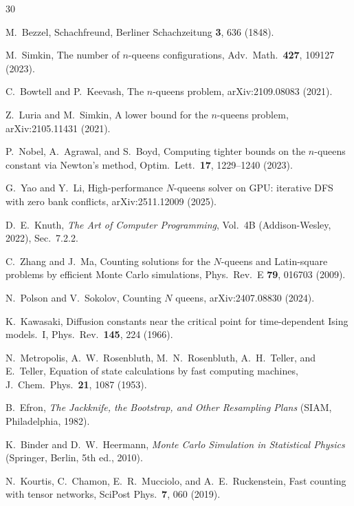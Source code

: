 \documentclass[aps, pre, reprint, amsmath, amssymb, superscriptaddress, floatfix]{revtex4-2}
\begin{document}
\begin{thebibliography}{30}

M.~Bezzel,
Schachfreund, Berliner Schachzeitung \textbf{3}, 636 (1848).

M.~Simkin,
The number of $n$-queens configurations,
Adv.\ Math.\ \textbf{427}, 109127 (2023).

C.~Bowtell and P.~Keevash,
The $n$-queens problem,
arXiv:2109.08083 (2021).

Z.~Luria and M.~Simkin,
A lower bound for the $n$-queens problem,
arXiv:2105.11431 (2021).

P.~Nobel, A.~Agrawal, and S.~Boyd,
Computing tighter bounds on the $n$-queens constant via Newton's method,
Optim.\ Lett.\ \textbf{17}, 1229--1240 (2023).

G.~Yao and Y.~Li,
High-performance $N$-queens solver on GPU: iterative DFS with zero
bank conflicts,
arXiv:2511.12009 (2025).

D.~E.~Knuth,
\textit{The Art of Computer Programming}, Vol.~4B
(Addison-Wesley, 2022), Sec.~7.2.2.

C.~Zhang and J.~Ma,
Counting solutions for the $N$-queens and Latin-square problems by
efficient Monte Carlo simulations,
Phys.\ Rev.\ E \textbf{79}, 016703 (2009).

N.~Polson and V.~Sokolov,
Counting $N$ queens,
arXiv:2407.08830 (2024).

K.~Kawasaki,
Diffusion constants near the critical point for time-dependent Ising
models.\ I,
Phys.\ Rev.\ \textbf{145}, 224 (1966).

N.~Metropolis, A.~W.~Rosenbluth, M.~N.~Rosenbluth, A.~H.~Teller,
and E.~Teller,
Equation of state calculations by fast computing machines,
J.~Chem.~Phys.\ \textbf{21}, 1087 (1953).

B.~Efron,
\textit{The Jackknife, the Bootstrap, and Other Resampling Plans}
(SIAM, Philadelphia, 1982).

K.~Binder and D.~W.~Heermann,
\textit{Monte Carlo Simulation in Statistical Physics}
(Springer, Berlin, 5th ed., 2010).

N.~Kourtis, C.~Chamon, E.~R.~Mucciolo, and A.~E.~Ruckenstein,
Fast counting with tensor networks,
SciPost Phys.\ \textbf{7}, 060 (2019).


\end{thebibliography}
\end{document}
